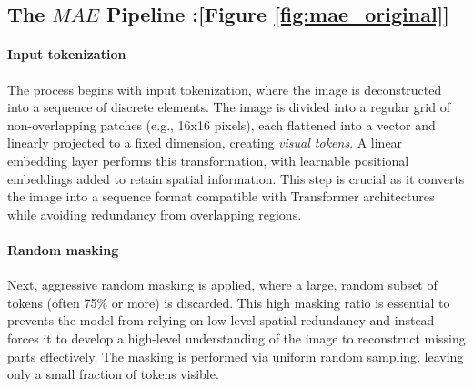 \subsection*{The ${MA}E$  Pipeline :[Figure \ref{fig:mae_original}]}

\paragraph{Input tokenization} The process begins with input tokenization, where the image is deconstructed into a sequence of discrete elements. The image is divided into a regular grid of non-overlapping patches (e.g., 16x16 pixels), each flattened into a vector and linearly projected to a fixed dimension, creating \textit{visual tokens}. A linear embedding layer performs this transformation, with learnable positional embeddings added to retain spatial information. This step is crucial as it converts the image into a sequence format compatible with Transformer architectures while avoiding redundancy from overlapping regions.
\paragraph{Random masking} Next, aggressive random masking is applied, where a large, random subset of tokens (often 75\% or more) is discarded. This high masking ratio is essential to  prevents the model from relying on low-level spatial redundancy and instead forces it to develop a high-level understanding of the image to reconstruct missing parts effectively. The masking is performed via uniform random sampling, leaving only a small fraction of tokens visible.

